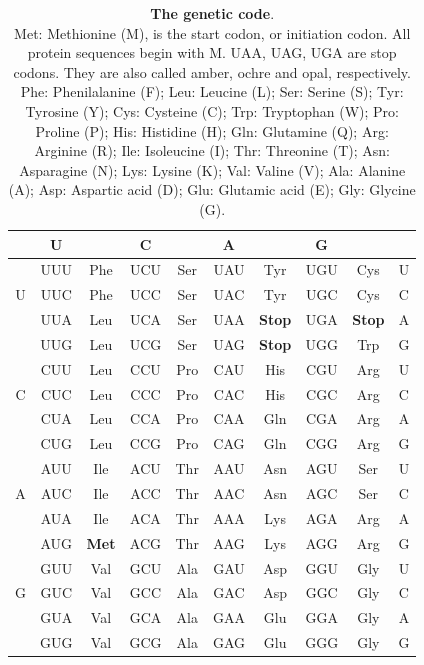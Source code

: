 \begin{table}[h]
    \centering
    \begin{tabular}{c|c c|c c|c c|c c|c}
          &  U  &  & C & & A & & G \\
        \hline
          & UUU & Phe & UCU & Ser & UAU & Tyr & UGU & Cys & U\\
        U & UUC & Phe & UCC & Ser & UAC & Tyr & UGC & Cys & C\\
          & UUA & Leu & UCA & Ser & UAA & \textbf{Stop} & UGA & \textbf{Stop} & A\\
          & UUG & Leu & UCG & Ser & UAG & \textbf{Stop} & UGG & Trp & G\\
        \hline
          & CUU & Leu & CCU & Pro & CAU & His & CGU & Arg & U \\
        C & CUC & Leu & CCC & Pro & CAC & His & CGC & Arg & C \\
          & CUA & Leu & CCA & Pro & CAA & Gln & CGA & Arg & A \\
          & CUG & Leu & CCG & Pro & CAG & Gln & CGG & Arg & G \\
        \hline
          & AUU & Ile & ACU & Thr & AAU & Asn & AGU & Ser & U \\
        A & AUC & Ile & ACC & Thr & AAC & Asn & AGC & Ser & C \\
          & AUA & Ile & ACA & Thr & AAA & Lys & AGA & Arg & A \\
          & AUG & \textbf{Met} & ACG & Thr & AAG & Lys & AGG & Arg & G \\
        \hline
          & GUU & Val & GCU & Ala & GAU & Asp & GGU & Gly & U\\
        G & GUC & Val & GCC & Ala & GAC & Asp & GGC & Gly & C\\
          & GUA & Val & GCA & Ala & GAA & Glu & GGA & Gly & A\\
          & GUG & Val & GCG & Ala & GAG & Glu & GGG & Gly & G\\
    \end{tabular}
\caption[Genetic Code]{\textbf{The genetic code}.\\
Met: Methionine (M), is the start codon, or initiation codon.
All protein sequences begin with M.
UAA, UAG, UGA are stop codons. 
They are also called amber, ochre and opal, respectively. %
Phe: Phenilalanine (F); Leu: Leucine (L); Ser: Serine (S); Tyr: Tyrosine (Y); Cys: Cysteine (C); Trp: Tryptophan (W); Pro: Proline (P); His: Histidine (H); Gln: Glutamine (Q); Arg: Arginine (R); Ile: Isoleucine (I); Thr: Threonine (T); Asn: Asparagine (N); Lys: Lysine (K); Val: Valine (V); Ala: Alanine (A); Asp: Aspartic acid (D); Glu: Glutamic acid (E); Gly: Glycine (G).}
\label{tab:genetic_code}
\end{table}


